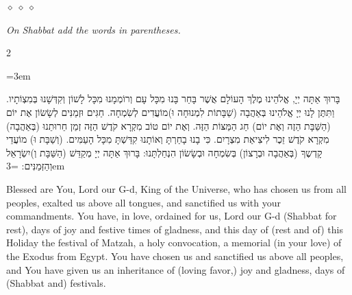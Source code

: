 \documentclass[11pt, openany]{book}
\newcommand{\instruction}[1]{%
  \par\vspace{3pt}
  \begin{tcolorbox}[
    enhanced,
    breakable,
    colback=sederlight,
    colframe=sederlight,
    boxrule=0pt,
    left=10pt,
    right=6pt,
    top=4pt,
    bottom=4pt,
    borderline west={2pt}{0pt}{sederwine!60},
    arc=0pt,
    outer arc=0pt,
  ]
    {\small\itshape\textcolor{sederwine}{#1}}
  \end{tcolorbox}
  \par\vspace{2pt}
}
\newcommand{\sederdivider}{%
  \par\vspace{6pt}
  \begin{center}
    \textcolor{sedergold}{\pgfornament[width=1.5cm]{11}}
  \end{center}
  \par\vspace{6pt}
}
\newenvironment{bilingual}{%
  \par\vspace{4pt}%
  \begin{paracol}{2}%
}{%
  \end{paracol}%
  \par\vspace{2pt}%
}
\newenvironment{hebrewcol}{%
  \switchcolumn[1]%
  \begingroup
  \RTL
  \hebrewfont\large
  \setstretch{1.4}%
  \emergencystretch=3em
  \tolerance=9999
  \parindent=0pt\relax
}{%
  \endRTL
  \endgroup
}
\newenvironment{englishcol}{%
  \switchcolumn[0]%
  \begingroup
  \setstretch{1.4}%
  \emergencystretch=3em
  \tolerance=9999
  \normalsize
  \rightskip=0.12in\relax
}{%
  \endgroup
}
\newcommand{\parasep}{%
  \par\vspace{3pt}
  \begin{center}
    \textcolor{sedergold!50}{\tiny$\diamond\;\diamond\;\diamond$}
  \end{center}
  \par\vspace{3pt}
}
\begin{document}
\parasep

\instruction{On Shabbat add the words in parentheses.}

\begin{bilingual}
\begin{hebrewcol}
בָּרוּךְ אַתָּה יְיָ, אֱלֹהֵינוּ מֶלֶךְ הָעוֹלָם אֲשֶׁר בָּחַר בָּנוּ מִכָּל עָם וְרוֹמְמָנוּ מִכָּל לָשׁוֹן וְקִדְּשָׁנוּ בְּמִצְוֹתָיו. וַתִּתֶּן לָנוּ יְיָ אֱלֹהֵינוּ בְּאַהֲבָה (שַׁבָּתוֹת לִמְנוּחָה וּ)מוֹעֲדִים לְשִׂמְחָה. חַגִּים וּזְמַנִּים לְשָׂשׂוֹן אֶת יוֹם (הַשַּׁבָּת הַזֶה וְאֶת יוֹם) חַג הַמַּצּוֹת הַזֶּה. וְאֶת יוֹם טוֹב מִקְרָא קֹדֶשׁ הַזֶּה זְמַן חֵרוּתֵנוּ (בְּאַהֲבָה) מִקְרָא קֹדֶשׁ זֵכֶר לִיצִיאַת מִצְרָיִם. כִּי בָנוּ בָחַרְתָּ וְאוֹתָנוּ קִדַּשְׁתָּ מִכָּל הָעַמִּים. (וְשַׁבָּת וּ) מוֹעֲדֵי קָדְשֶךָ (בְּאַהֲבָה וּבְרָצוֹן) בְּשִׂמְחָה וּבְשָׂשׂוֹן הִנְחַלְתָּנוּ: בָּרוּךְ אַתָּה יְיָ מְקַדֵּשׁ (הַשַּׁבָּת וְ)יִשְׂרָאֵל וְהַזְּמַנִּים:
\end{hebrewcol}
\begin{englishcol}
Blessed are You, Lord our G-d, King of the Universe, who has chosen us from all peoples, exalted us above all tongues, and sanctified us with your commandments. You have, in love, ordained for us, Lord our G-d (Shabbat for rest), days of joy and festive times of gladness, and this day of (rest and of) this Holiday the festival of Matzah, a holy convocation, a memorial (in your love) of the Exodus from Egypt. You have chosen us and sanctified us above all peoples, and You have given us an inheritance of (loving favor,) joy and gladness, days of (Shabbat and) festivals.
\end{englishcol}
\end{bilingual}

\sederdivider
\end{document}
